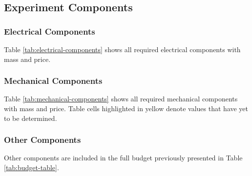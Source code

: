 \begin{landscape}
\subsection{Experiment Components}
\subsubsection{Electrical Components}

Table \ref{tab:electrical-components} shows all required electrical components with mass and price.




\end{landscape}

\begin{landscape}

\subsubsection{Mechanical Components}

Table \ref{tab:mechanical-components} shows all required mechanical components with mass and price. Table cells highlighted in yellow denote values that have yet to be determined.




\end{landscape}

\subsubsection{Other Components}

Other components are included in the full budget previously presented in Table \ref{tab:budget-table}.


\raggedbottom